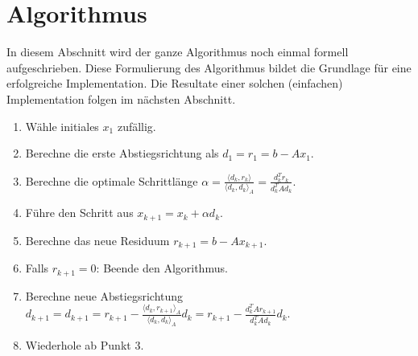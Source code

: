 \section{Algorithmus\label{cg:section:algorithmus}}

In diesem Abschnitt wird der ganze Algorithmus noch einmal formell aufgeschrieben.
Diese Formulierung des Algorithmus bildet die Grundlage für eine erfolgreiche Implementation.
Die Resultate einer solchen (einfachen) Implementation folgen im nächsten Abschnitt.

\begin{enumerate}
	\item Wähle initiales $x_1$ zufällig.
	\item Berechne die erste Abstiegsrichtung als $d_1 = r_1 =  b-Ax_1$.
	\item Berechne die optimale Schrittlänge  $ \alpha	= 	\displaystyle  \frac{\langle d_k , r_k \rangle}{\langle d_k , d_k \rangle_A} 
																			= \frac{d_k^T  r_k}{d_k^T A d_k }$.
	\item Führe den Schritt aus $x_{k+1} = x_k + \alpha d_k$.
	\item Berechne das neue Residuum $r_{k+1} = b-Ax_{k+1}$.
	\item Falls $r_{k+1} = 0$: Beende den Algorithmus.
	\item Berechne neue Abstiegsrichtung $d_{k+1} = d_{k+1}	= 	r_{k+1} - \displaystyle \frac{\langle d_k , r_{k+1} \rangle_A}{\langle d_k , d_k \rangle_A} d_k 
															= r_{k+1} - \displaystyle \frac{d_k^T A r_{k+1}}{d_k^T A d_k} d_k$.
	\item Wiederhole ab Punkt 3.
\end{enumerate}
